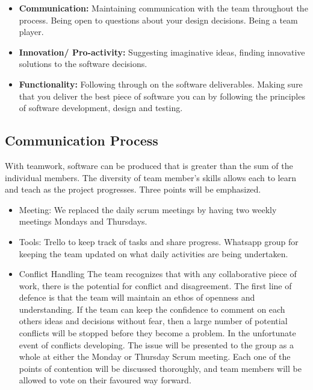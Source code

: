 \documentclass[11pt]{article}
\begin{document}
\begin{itemize}
	\item \textbf{Communication:}
	 Maintaining communication with the team throughout the process. Being open to questions about your design decisions. Being a team player.
	
	\item \textbf{Innovation/ Pro-activity:}
	 Suggesting imaginative ideas, finding innovative solutions to the software decisions.
	
	\item \textbf{Functionality:}
	 Following through on the software deliverables. Making sure that you deliver the best piece of software you can by following the principles of software development, design and testing.
\end{itemize}

\subsection{Communication Process}
With teamwork, software can be produced that is greater than the sum of the individual members. The diversity of team member's skills allows each to learn and teach as the project progresses. Three points will be emphasized.
  \begin{itemize}
  	\item Meeting: We replaced the daily scrum meetings by having two weekly meetings Mondays and Thursdays.
 	\item Tools: Trello to keep track of tasks and share progress. Whatsapp group for keeping the team updated on what daily activities are being undertaken.
  	\item Conflict Handling
 \subitem The team recognizes that with any collaborative piece of work, there is the potential for conflict and disagreement. The first line of defence is that the team will maintain an ethos of openness and understanding. If the team can keep the confidence to comment on each others ideas and decisions without fear, then a large number of potential conflicts will be stopped before they become a problem.
 \subitem In the unfortunate event of conflicts developing. The issue will be presented to the group as a whole at either the Monday or Thursday Scrum meeting. Each one of the points of contention will be discussed thoroughly, and team members will be allowed to vote on their favoured way forward.
  \end{itemize}
\end{document}
